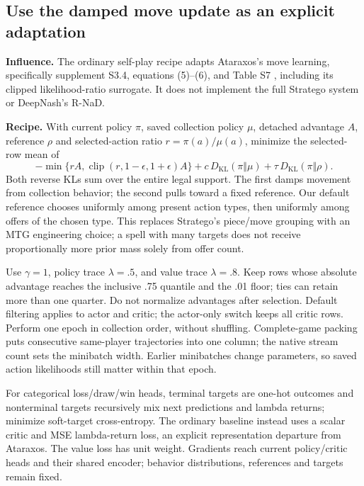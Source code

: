 \documentclass[11pt]{article}
\begin{document}
\subsection{Use the damped move update as an explicit adaptation}

\textbf{Influence.} The ordinary self-play recipe adapts Ataraxos's move learning, specifically supplement S3.4, equations (5)--(6), and Table S7 \citep{sokota2026ataraxos}, including its clipped likelihood-ratio surrogate. It does not implement the full Stratego system or DeepNash's R-NaD.

\textbf{Recipe.} With current policy $\pi$, saved collection policy $\mu$, detached advantage $A$, reference $\rho$ and selected-action ratio $r=\pi(a)/\mu(a)$, minimize the selected-row mean of
\[
 -\min\{rA,\operatorname{clip}(r,1-\epsilon,1+\epsilon)A\}
 +c\,D_{\mathrm{KL}}(\pi\Vert\mu)
 +\tau\,D_{\mathrm{KL}}(\pi\Vert\rho).
\]
Both reverse KLs sum over the entire legal support. The first damps movement from collection behavior; the second pulls toward a fixed reference. Our default reference chooses uniformly among present action types, then uniformly among offers of the chosen type. This replaces Stratego's piece/move grouping with an MTG engineering choice; a spell with many targets does not receive proportionally more prior mass solely from offer count.

Use $\gamma=1$, policy trace $\lambda=.5$, and value trace $\lambda=.8$. Keep rows whose absolute advantage reaches the inclusive .75 quantile and the .01 floor; ties can retain more than one quarter. Do not normalize advantages after selection. Default filtering applies to actor and critic; the actor-only switch keeps all critic rows. Perform one epoch in collection order, without shuffling. Complete-game packing puts consecutive same-player trajectories into one column; the native stream count sets the minibatch width. Earlier minibatches change parameters, so saved action likelihoods still matter within that epoch.

For categorical loss/draw/win heads, terminal targets are one-hot outcomes and nonterminal targets recursively mix next predictions and lambda returns; minimize soft-target cross-entropy. The ordinary baseline instead uses a scalar critic and MSE lambda-return loss, an explicit representation departure from Ataraxos. The value loss has unit weight. Gradients reach current policy/critic heads and their shared encoder; behavior distributions, references and targets remain fixed.
\end{document}
